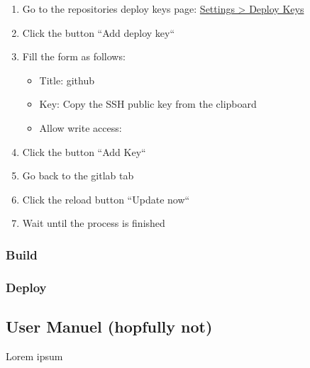 \begin{enumerate}
    \item Go to the repositories deploy keys page: \href{https://github.com/decibel-threshold-event-displayer/decibel-threshold-event-displayer.github.io/settings/keys}{Settings > Deploy Keys}
    \item Click the button ``Add deploy key``
    \item Fill the form as follows:
    \begin{itemize}
        \item Title: github
        \item Key: Copy the SSH public key from the clipboard
        \item Allow write access:
    \end{itemize}
    \item Click the button ``Add Key``
    \item Go back to the gitlab tab
    \item Click the reload button ``Update now``
    \item Wait until the process is finished
\end{enumerate}

\subsubsection{Build}

\subsubsection{Deploy}

\subsection{User Manuel (hopfully not)}
Lorem ipsum


